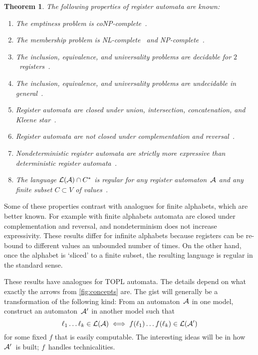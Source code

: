 \documentclass[9pt, preprint]{sigplanconf} %
\newcommand{\noterg}[2]{\textcolor{gray}{[\textcolor{red}{#1}: #2]}}
\newcommand{\rlp}[1]{\noterg{rlp}{#1}}
\newtheorem{theorem}{Theorem}
\theoremstyle{definition}
\theoremstyle{remark}
\renewcommand{\noterg}[2]{}
\begin{document}
\begin{theorem}\label{th:ra}
The following properties of register automata are known:
\begin{enumerate}
\item The emptiness problem is coNP-complete~\cite{dblp:journals/tcs/sakamotoi00}.
\item The membership problem is NL-complete~\cite{dblp:conf/mfcs/nevensv01} and NP-complete~\cite{dblp:journals/tcs/sakamotoi00}.
\item The inclusion, equivalence, and universality problems are decidable for $2$~registers~\cite{dblp:conf/focs/kaminskif90,dblp:conf/mfcs/nevensv01}.
\item The inclusion, equivalence, and universality problems are undecidable in general~\cite{dblp:conf/mfcs/nevensv01}.
\item Register automata are closed under union, intersection, concatenation, and Kleene star~\cite{dblp:conf/focs/kaminskif90}.
\rlp{Not completely sure if we are talking about the full class.}
\item Register automata are \emph{not} closed under complementation and reversal~\cite{dblp:conf/focs/kaminskif90}.
\rlp{ditto}
\item Nondeterministic register automata are strictly more expressive than deterministic register automata~\cite{dblp:conf/focs/kaminskif90}.
\rlp{ditto\ldots}
\item The language ${\cal L}({\cal A})\cap C^*$ is regular for any register automaton~${\cal A}$ and any finite subset $C\subset V$ of values~\cite{dblp:conf/focs/kaminskif90}.
\end{enumerate}
\end{theorem}

Some of these properties contrast with analogues for finite alphabets, which are better known.
For example with finite alphabets automata are closed under complementation and reversal, and nondeterminism does not increase expressivity.
These results differ for infinite alphabets because registers can be re-bound to different values an unbounded number of times.
On the other hand, once the alphabet is `sliced' to a finite subset, the resulting language is regular in the standard sense.

These results have analogues for TOPL automata.
The details depend on what exactly the arrows from \autoref{fig:concepts} are.
The gist will generally be a transformation of the following kind:
From an automaton~${\cal A}$ in one model, construct an automaton~${\cal A}'$ in another model such that
\[ \ell_1\ldots \ell_k \in {\cal L}({\cal A})
  \iff
f(\ell_1)\ldots f(\ell_k)\in{\cal L}({\cal A}') \]
for some fixed $f$ that is easily computable.
The interesting ideas will be in how ${\cal A}'$~is built;
$f$~handles technicalities.
\end{document}
